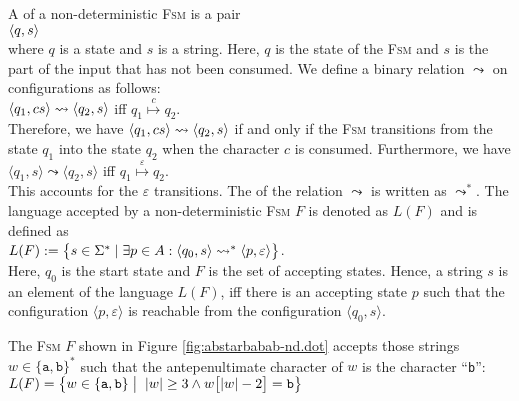 A  of a non-deterministic \textsc{Fsm} 
is a pair
\\[0.2cm]
\hspace*{1.3cm}
$\pair(q, s)$
\\[0.2cm]
where  $q$ is a state and $s$ is a  string.  Here, $q$ is the state of
the \textsc{Fsm} and $s$ is the part of the input that has not been
consumed.  We define a binary relation
$\leadsto$ \index{$\leadsto$} on configurations as follows:
\\[0.2cm]
\hspace*{1.3cm}
$\pair(q_1, cs) \leadsto \pair(q_2, s)$ \quad iff \quad $q_1 \stackrel{c}{\mapsto} q_2$.
\\[0.2cm]
Therefore, we have $\pair(q_1,cs) \leadsto \pair(q_2, s)$ if and only
if the \textsc{Fsm} transitions from the state
$q_1$ into the state $q_2$ when the character $c$ is consumed.
Furthermore, we have
\\[0.2cm]
\hspace*{1.3cm}
$\langle q_1, s \rangle \leadsto \langle q_2, s \rangle$ \quad iff \quad $q_1 \stackrel{\varepsilon}{\mapsto} q_2$.
\\[0.2cm]
This accounts for the $\varepsilon$ transitions.  The
 of the relation $\leadsto$ is written as $\leadsto^*$.
The language accepted by a non-deterministic \textsc{Fsm} $F$ is
denoted as $L(F)$ and is defined as
\\[0.2cm]
\hspace*{1.3cm}
$L(F) := \bigl\{ s \in \Sigma^* \mid  
                 \exists p \in A : \pair(q_0,s) \leadsto^* \pair(p,\varepsilon) \bigr\}$.
\\[0.2cm]
Here,  $q_0$ is the  start state and $F$ is the set of accepting
states.  Hence, a string  $s$ is an element of the language  $L(F)$,  
iff there is an accepting state $p$ such that the configuration $\langle p, \varepsilon \rangle$ is reachable from the configuration $\langle q_0, s \rangle$.

\exampleEng 
The \textsc{Fsm} $F$ shown in Figure \ref{fig:abstarbabab-nd.dot} accepts
those strings $w \in \{ \mathtt{a}, \mathtt{b} \}^*$ such that the
antepenultimate character of $w$ is  the character ``\texttt{b}'':
\\[0.2cm]
\hspace*{1.3cm}
$L(F) = \bigl\{ w \in \{ \mathtt{a}, \mathtt{b} \} \bigm|\; |w| \geq 3 \wedge w\bigl[|w|-2\bigr] = \mathtt{b} \bigr\}$
 \eox
\vspace*{0.3cm}

